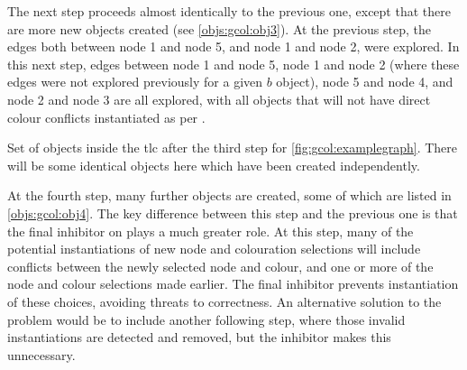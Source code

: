 The next step proceeds almost identically to the previous one, except that there are more new objects created (see \cref{objs:gcol:obj3}).  At the previous step, the edges both between node 1 and node 5, and node 1 and node 2, were explored.  In this next step, edges between node 1 and node 5, node 1 and node 2 (where these edges were not explored previously for a given \(b\) object), node 5 and node 4, and node 2 and node 3 are all explored, with all objects that will not have direct colour conflicts instantiated as per .

\begin{cpobjectsfloat}
\begin{cpobjects}
%    
    \cpobjectsline{
        \vdots
    }
\end{cpobjects}
\caption[Set of objects inside the \gls{tlc} after the third step for the \gls{gcp} \gls{cps} solution]{\label{objs:gcol:obj3}Set of objects inside the \gls{tlc} after the third step for \cref{fig:gcol:examplegraph}.  There will be some identical objects here which have been created independently.}
\end{cpobjectsfloat}

At the fourth step, many further objects are created, some of which are listed in \cref{objs:gcol:obj4}.  The key difference between this step and the previous one is that the final inhibitor on  plays a much greater role.  At this step, many of the potential instantiations of new node and colouration selections will include conflicts between the newly selected node and colour, and one or more of the node and colour selections made earlier.  The final inhibitor prevents instantiation of these choices, avoiding threats to correctness.  An alternative solution to the problem would be to include another following step, where those invalid instantiations are detected and removed, but the inhibitor makes this unnecessary.  

